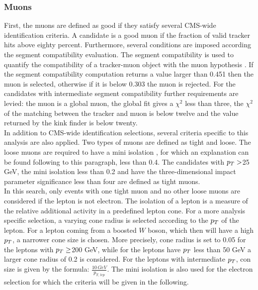\subsubsection{Muons}
First, the muons are defined as good if they satisfy several CMS-wide identification criteria. A candidate is a good muon if the fraction of valid tracker hits above eighty percent. Furthermore, several conditions are imposed according the segment compatibility evaluation. The segment compatibility is used to quantify the compatibility of a tracker-muon object with the muon hypothesis \cite{segment}. If the segment compatibility computation returns a value larger than 0.451 then the muon is selected, otherwise if it is below 0.303 the muon is rejected. For the candidates with intermediate segment compatibility further requirements are levied: the muon is a global muon, the global fit gives a $\chi^2$ less than three, the $\chi^2$ of the matching between the tracker and muon is below twelve and the value returned by the kink finder is below twenty. \\
In addition to CMS-wide identification selections, several criteria specific to this analysis are also applied. Two types of muons are defined as tight and loose. The loose muons are required to have a mini isolation \cite{miniIso}, for which an explanation can be found following to this paragraph, less than 0.4. The candidates with $p_T>$25 GeV, the mini isolation less than 0.2 and have the three-dimensional impact parameter significance less than four are defined as tight muons. \\ 
In this search, only events with one tight muon and no other loose muons are considered if the lepton is not electron.
The isolation of a lepton is a measure of the relative additional activity in a predefined lepton cone. For a more analysis specific selection, a varying cone radius is selected according to the $p_T$ of the lepton. For a lepton coming from a boosted $W$ boson, which then will have a high $p_T$, a narrower cone size is chosen. More precisely, cone radius is set to 0.05 for the leptons with $p_T\geq$200 GeV, while for the leptons have $p_T$ less than 50 GeV a larger cone radius of 0.2 is considered. For the leptons with intermediate $p_T$, con size is given by the formula: $\frac{10\,GeV}{p_{T,\,lep}} $.
The mini isolation is also used for the electron selection for which the criteria will be given in the following.
